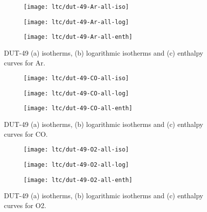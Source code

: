 \begin{figure}[htb]
    \centering
    \begin{subfigure}{0.33\linewidth}
        \texttt{[image: ltc/dut-49-Ar-all-iso]}%
        \caption{}
    \end{subfigure}%
    \begin{subfigure}{0.33\linewidth}
        \texttt{[image: ltc/dut-49-Ar-all-log]}%
        \caption{}
    \end{subfigure}%
    \begin{subfigure}{0.33\linewidth}
        \texttt{[image: ltc/dut-49-Ar-all-enth]}%
        \caption{}
    \end{subfigure}%
    \caption{DUT-49 (a) isotherms, (b) logarithmic isotherms and 
    (c) enthalpy curves for Ar.}%
    \label{appx:dut:fgr:dut-49-Ar-ltc}
\end{figure}

\begin{figure}[htb]
    \centering
    \begin{subfigure}{0.33\linewidth}
        \texttt{[image: ltc/dut-49-CO-all-iso]}%
        \caption{}
    \end{subfigure}%
    \begin{subfigure}{0.33\linewidth}
        \texttt{[image: ltc/dut-49-CO-all-log]}%
        \caption{}
    \end{subfigure}%
    \begin{subfigure}{0.33\linewidth}
        \texttt{[image: ltc/dut-49-CO-all-enth]}%
        \caption{}
    \end{subfigure}%
    \caption{DUT-49 (a) isotherms, (b) logarithmic isotherms and 
    (c) enthalpy curves for CO.}%
    \label{appx:dut:fgr:dut-49-CO-ltc}
\end{figure}

\begin{figure}[htb]
    \centering
    \begin{subfigure}{0.33\linewidth}
        \texttt{[image: ltc/dut-49-O2-all-iso]}%
        \caption{}
    \end{subfigure}%
    \begin{subfigure}{0.33\linewidth}
        \texttt{[image: ltc/dut-49-O2-all-log]}%
        \caption{}
    \end{subfigure}%
    \begin{subfigure}{0.33\linewidth}
        \texttt{[image: ltc/dut-49-O2-all-enth]}%
        \caption{}
    \end{subfigure}%
    \caption{DUT-49 (a) isotherms, (b) logarithmic isotherms and 
    (c) enthalpy curves for O2.}%
    \label{appx:dut:fgr:dut-49-O2-ltc}
\end{figure}


